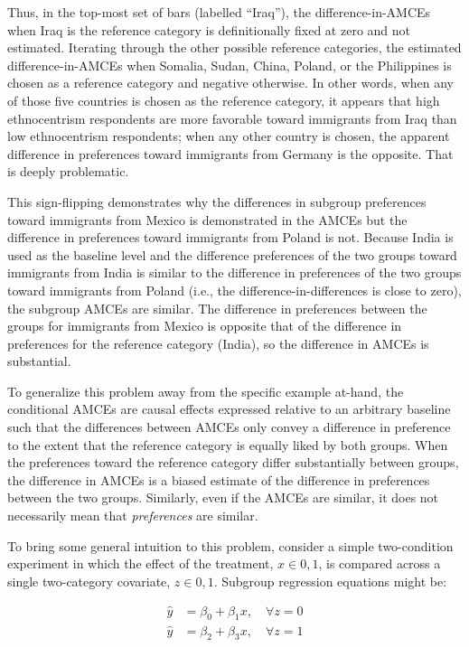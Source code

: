 \documentclass[a4paper,12pt]{article}\usepackage[]{graphicx}\usepackage[]{color}
\begin{document}
Thus, in the top-most set of bars (labelled ``Iraq''), the difference-in-AMCEs when Iraq is the reference category is definitionally fixed at zero and not estimated. Iterating through the other possible reference categories, the estimated difference-in-AMCEs when Somalia, Sudan, China, Poland, or the Philippines is chosen as a reference category and negative otherwise. In other words, when any of those five countries is chosen as the reference category, it appears that high ethnocentrism respondents are more favorable toward immigrants from Iraq than low ethnocentrism respondents; when any other country is chosen, the apparent difference in preferences toward immigrants from Germany is the opposite. That is deeply problematic.

This sign-flipping demonstrates why the differences in subgroup preferences toward immigrants from Mexico is demonstrated in the AMCEs but the difference in preferences toward immigrants from Poland is not. Because India is used as the baseline level and the difference preferences of the two groups toward immigrants from India is similar to the difference in preferences of the two groups toward immigrants from Poland (i.e., the difference-in-differences is close to zero), the subgroup AMCEs are similar. The difference in preferences between the groups for immigrants from Mexico is opposite that of the difference in preferences for the reference category (India), so the difference in AMCEs is substantial.

To generalize this problem away from the specific example at-hand, the conditional AMCEs are causal effects expressed relative to an arbitrary baseline such that the differences between AMCEs only convey a difference in preference to the extent that the reference category is equally liked by both groups. When the preferences toward the reference category differ substantially between groups, the difference in AMCEs is a biased estimate of the difference in preferences between the two groups. Similarly, even if the AMCEs are similar, it does not necessarily mean that \textit{preferences} are similar.

To bring some general intuition to this problem, consider a simple two-condition experiment in which the effect of the treatment, $x \in {0,1}$, is compared across a single two-category covariate, $z \in {0,1}$. Subgroup regression equations might be:

\begin{align*}
\hat{y} &= \beta_0 + \beta_1 x, \quad \forall z = 0 \\
\hat{y} &= \beta_2 + \beta_3 x, \quad \forall z = 1
\end{align*}
\end{document}
